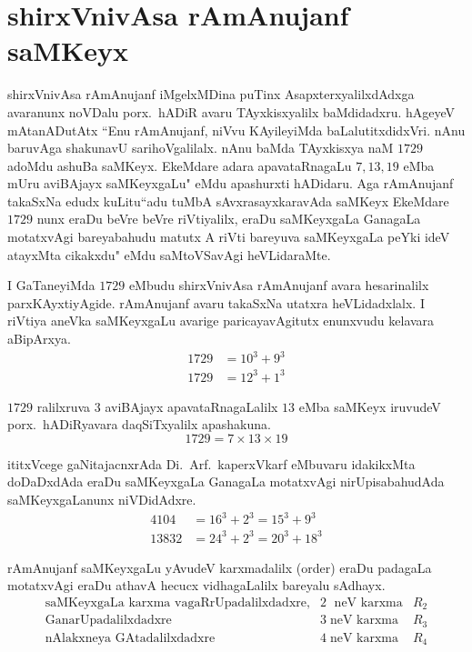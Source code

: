 \chapter{shirxVnivAsa rAmAnujanf saMKeyx}

shirxVnivAsa rAmAnujanf iMgelxMDina puTinx AsapxterxyalilxdAdxga avaranunx noVDalu  porx.~hADiR avaru TAyxkisxyalilx baMdidadxru. hAgeyeV mAtanADutAtx ``Enu rAmAnujanf, niVvu KAyileyiMda baLalutitxdidxVri. nAnu baruvAga shaku\-navU sarihoVgalilalx. nAnu baMda TAyxkisxya naM $1729$ adoMdu ashuBa saMKeyx. EkeMdare adara apavataRnagaLu $7,13,19$ eMba mUru aviBAjayx saMKeyxgaLu" eMdu apa\-shurxti hADidaru. Aga rAmAnujanf takaSxNa edudx kuLitu``adu tuMbA sAvxrasayxkaravAda saMKeyx EkeMdare $1729$ nunx eraDu beVre beVre riVtiyalilx, eraDu saMKeyxgaLa GanagaLa motatxvAgi bareyabahudu matutx A riVti bareyuva saMKeyxgaLa peYki ideV atayxMta cikakxdu" eMdu saMtoVSavAgi heVLidaraMte.

I GaTaneyiMda $1729$ eMbudu shirxVnivAsa rAmAnujanf avara hesarinalilx parxKAyxtiyAgide. rAmAnujanf avaru takaSxNa utatxra heVLidadxlalx. I riVtiya aneVka saMKeyxgaLu avarige paricayavAgitutx enunxvudu kelavara aBipArxya.
\begin{align*}
1729 &= 10^3+9^3\\
1729 &= 12^3+1^3 
\end{align*}

$1729$ ralilxruva $3$ aviBAjayx apavataRnagaLalilx $13$ eMba saMKeyx iruvudeV porx.~hADiRyavara daqSiTxyalilx apashakuna.
$$
1729 = 7\times 13 \times 19
$$

\eject

ititxVcege gaNitajacnxrAda Di.~Arf.\ kaperxVkarf eMbuvaru idakikxMta doDaDxdAda eraDu saMKeyxgaLa GanagaLa motatxvAgi nirUpisabahudAda saMKeyxgaLanunx niVDidAdxre.
\begin{align*}
4104 &= 16^3 + 2^3 = 15^3 +9^3\\
13832 &= 24^3 +2^3 = 20^3 +18^3
\end{align*}

rAmAnujanf saMKeyxgaLu yAvudeV karxmadalilx {\rm(order)} eraDu padagaLa motatx\-vAgi eraDu athavA hecucx vidhagaLalilx bareyalu sAdhayx.
$$
\begin{array}{rll}
\text{saMKeyxgaLa karxma vagaRrUpadalilxdadxre,} & 2\; \text{ neV karxma} & R_2\\
\text{GanarUpadalilxdadxre}                      & 3\; \text{neV karxma} & R_3\\
\text{nAlakxneya GAtadalilxdadxre}               & 4\; \text{neV karxma} & R_4
\end{array}
$$

